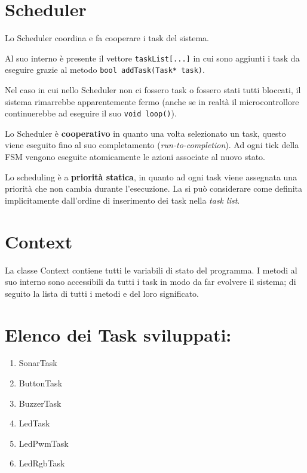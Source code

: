 \newpage
\section{Scheduler}
Lo Scheduler coordina e fa cooperare i task del sistema.

Al suo interno è presente il vettore \texttt{taskList[...]} in cui sono aggiunti i task da eseguire grazie al metodo \texttt{bool addTask(Task* task)}.

Nel caso in cui nello Scheduler non ci fossero task o fossero stati tutti bloccati, il sistema rimarrebbe apparentemente fermo (anche se in realtà il microcontrollore continuerebbe ad eseguire il suo \texttt{void loop()}).

Lo Scheduler è \textbf{cooperativo} in quanto una volta selezionato un task, questo viene eseguito fino al suo completamento (\textit{run-to-completion}). Ad ogni tick della FSM vengono eseguite atomicamente le azioni associate al nuovo stato.

Lo scheduling è a \textbf{priorità statica}, in quanto ad ogni task viene assegnata una priorità che non cambia durante l'esecuzione. La si può considerare come definita implicitamente dall'ordine di inserimento dei task nella \textit{task list}.

\section{Context}\label{sec:contextgeneric}
La classe Context contiene tutti le variabili di stato del programma. I metodi al suo interno sono accessibili da tutti i task in modo da far evolvere il sistema; di seguito la lista di tutti i metodi e del loro significato.

\section{Elenco dei Task sviluppati:}
\begin{enumerate}
	\item SonarTask
	\item ButtonTask
	\item BuzzerTask
	\item LedTask
	\item LedPwmTask
	\item LedRgbTask
\end{enumerate}

